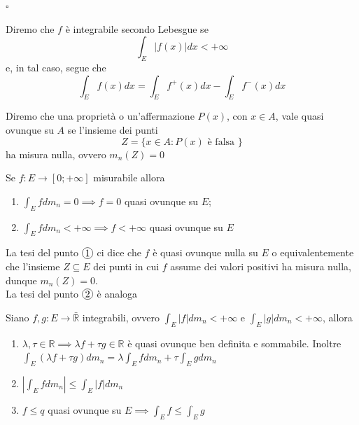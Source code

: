 \hfill $\square$
%
\vspace{0.5cm}
\begin{definition}[\textcolor{blue}{integrabilità secondo Lebesgue}]
	Diremo che $f$ è integrabile secondo Lebesgue se
	$$
	\int_E |f(x)|dx < +\infty
	$$
	e, in tal caso, segue che
	$$
	\int_E f(x)dx = \int_E f^{+}(x)dx - \int_E f^{-}(x)dx
	$$
\end{definition}
%
\vspace{0.5cm}
\begin{definition}[\textcolor{blue}{proprietà quasi ovunque}]
	Diremo che una proprietà o un'affermazione $P(x)$, con $x \in A$, vale quasi ovunque su $A$ se l'insieme dei punti
	$$
		Z = \{x \in A: P(x) \text{ è falsa } \}
	$$
	ha misura nulla, ovvero $m_n(Z) = 0$
\end{definition}
%
\vspace{0.5cm}
\begin{prop}
	Se $f: E \to [0; +\infty]$ misurabile allora
	\begin{enumerate}[label=\protect\circled{\arabic*}]
		\item $\int_E fdm_n = 0 \implies f=0$ quasi ovunque su $E$;
		\item $\int_E fdm_n < +\infty \implies f<+\infty$ quasi ovunque su $E$ 
	\end{enumerate}
\end{prop}
%
\begin{remark}
	La tesi del punto $\circled{1}$ ci dice che $f$ è quasi ovunque nulla su $E$ o equivalentemente che l'insieme $Z \subseteq E$ dei punti in cui $f$ assume dei valori positivi ha misura nulla, dunque $m_n(Z) = 0$. \\
	La tesi del punto $\circled{2}$ è analoga
\end{remark}
%
\vspace{0.5cm}
\begin{theorem}
	Siano $f, g: E \to \bar{\mathbb{R}}$ integrabili, ovvero $\int_E |f| dm_n < +\infty$ e $\int_E |g|dm_n < + \infty$, allora
	\begin{enumerate}[label=\protect\circled{\arabic*}]
		\item $\lambda, \tau \in \mathbb{R} \implies \lambda f + \tau g \in \mathbb{R}$ è quasi ovunque ben definita e sommabile. Inoltre
		$\int_E (\lambda f + \tau g) dm_n = \lambda \int_E f dm_n + \tau \int_E g dm_n$
		\item $|\int_E f dm_n| \leq \int_E |f|dm_n$
		\item $f \leq q$ quasi ovunque su $E \implies \int_E f \leq \int_E g$ 
	\end{enumerate}
\end{theorem}
